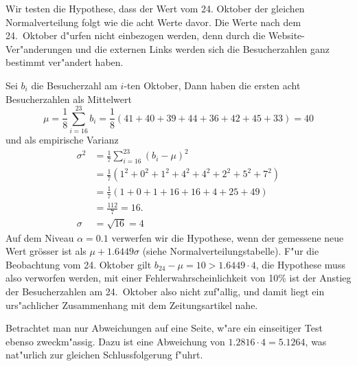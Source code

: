 \begin{loesung}
Wir testen die Hypothese, dass der Wert vom 24. Oktober der gleichen
Normalverteilung folgt wie die acht Werte davor. Die Werte nach
dem 24.~Oktober d"urfen nicht einbezogen werden, denn durch die
Website-Ver"anderungen und die externen Links werden sich die
Besucherzahlen ganz bestimmt ver"andert haben.

Sei $b_i$ die Besucherzahl am $i$-ten Oktober,
Dann haben die ersten acht Besucherzahlen als Mittelwert
$$\mu=\frac18\sum_{i=16}^{23}b_i=\frac18(41+40+39+44+36+42+45+33)=40$$
und als empirische Varianz
\begin{align*}
\sigma^2&=\frac17\sum_{i=16}^{23}(b_i-\mu)^2\\
&=\frac17(1^2+0^2+1^2+4^2+4^2+2^2+5^2+7^2)\\
&=\frac17(1 + 0 + 1 + 16 + 16 + 4 + 25 + 49)\\
&=\frac{112}{7}=16.\\
\sigma&=\sqrt{16}=4
\end{align*}
Auf dem Niveau $\alpha=0.1$ verwerfen wir die Hypothese, wenn der gemessene
neue Wert gr\"osser ist als $\mu + 1.6449\sigma$
(siehe Normalverteilungstabelle). F"ur die Beobachtung
vom 24. Oktober gilt $b_{24}-\mu=10 > 1.6449\cdot 4$, die Hypothese
muss also verworfen werden, mit einer Fehlerwahrscheinlichkeit von 10\%
ist der Anstieg der Besucherzahlen am 24.~Oktober also nicht zuf"allig,
und damit liegt ein urs"achlicher Zusammenhang mit dem Zeitungsartikel nahe.

Betrachtet man nur Abweichungen auf eine Seite, w"are ein einseitiger Test
ebenso zweckm"assig. Dazu ist eine Abweichung von $1.2816\cdot 4=5.1264$,
was nat"urlich zur gleichen Schlussfolgerung f"uhrt.
\end{loesung}

